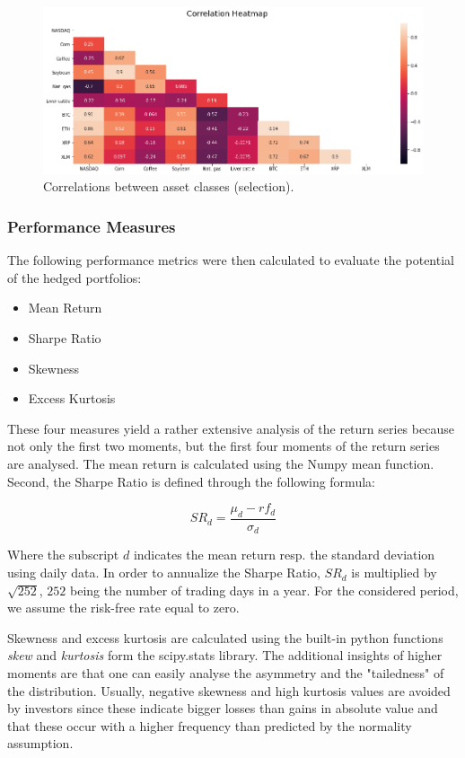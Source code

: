 \documentclass[11pt]{article}
\begin{document}
\begin{figure}[H]
   
    \includegraphics[width=1\textwidth]{images/heatmap_small.png}  
  \caption{Correlations between asset classes (selection).}
  \label{Correlations_small}
\end{figure}



\subsubsection{Performance Measures}
The following performance metrics were then calculated to evaluate the potential of the hedged portfolios:
\begin{itemize}
  \item Mean Return
  \item Sharpe Ratio
  \item Skewness
  \item Excess Kurtosis
\end{itemize}

\noindent These four measures yield a rather extensive analysis of the return series because not only the first two moments, but the first four moments of the return series are analysed. The mean return is calculated using the Numpy mean function. Second, the Sharpe Ratio is defined through the following formula:

\begin{equation} \label{eq:sharpe}
SR_d = \frac{\mu_d - rf_d}{\sigma_d} 
\end{equation}

\noindent Where the subscript $d$ indicates the mean return resp. the standard deviation using daily data. In order to annualize the Sharpe Ratio, $SR_d$ is multiplied by $\sqrt{252}$, $252$ being the number of trading days in a year.
For the considered period, we assume the risk-free rate equal to zero.

\noindent Skewness and excess kurtosis are calculated using the built-in python functions \textit{skew} and \textit{kurtosis} form the scipy.stats library. The additional insights of higher moments are that one can easily analyse the asymmetry and the "tailedness" of the distribution. Usually, negative skewness and high kurtosis values are avoided by investors since these indicate bigger losses than gains in absolute value and that these occur with a higher frequency than predicted by the normality assumption.
\end{document}
